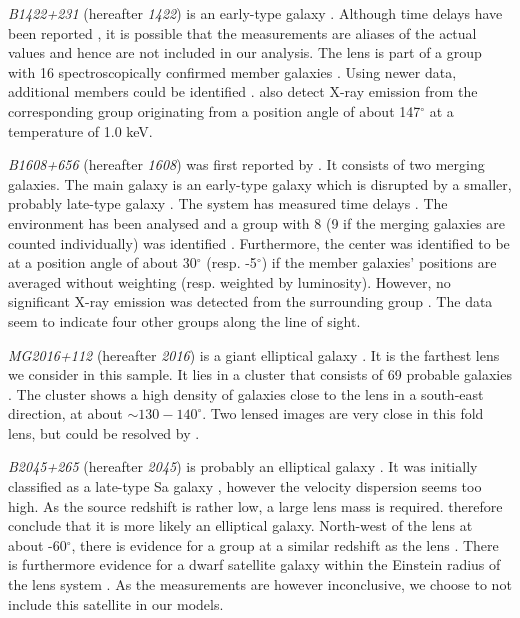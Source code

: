 \documentclass[useAMS,usenatbib]{mn2e}
\begin{document}
\textit{B1422+231} (hereafter \textit{1422}) is an early-type galaxy \citep{1992MNRAS.259P...1P,1994AJ....107...28Y}. Although time delays have been reported \citep{2001MNRAS.326.1403P}, it is possible that the measurements are aliases of the actual values \citep{2003AJ....126...29R} and hence are not included in our analysis. The lens is part of a group with 16 spectroscopically confirmed member galaxies \citep{2006ApJ...641..169M}. Using newer data, additional members could be identified \citep{2011ApJ...726...84W}. \citet{2004ApJ...610..686G} also detect X-ray emission from the corresponding group originating from a position angle of about 147$^{\circ}$ at a temperature of 1.0 keV.

\textit{B1608+656} (hereafter \textit{1608}) was first reported by \citet{1995ApJ...447L...5M}. It consists of two merging galaxies. The main galaxy is an early-type galaxy which is disrupted by a smaller, probably late-type galaxy \citep{2003ApJ...584..100S}. The system has measured time delays \citep{2002ApJ...581..823F}. The environment has been analysed and a group with 8 (9 if the merging galaxies are counted individually) was identified \citep{2006ApJ...642...30F}. Furthermore, the center was identified to be at a position angle of about 30$^{\circ}$ (resp. -5$^{\circ}$) if the member galaxies' positions are averaged without weighting (resp. weighted by luminosity). However, no significant X-ray emission was detected from the surrounding group \citep{2005ApJ...625..633D}. The data seem to indicate four other groups along the line of sight.

\textit{MG2016+112} (hereafter \textit{2016}) is a giant elliptical galaxy \citep{1984Sci...223...46L,1986AJ.....91..991S}. It is the farthest lens we consider in this sample. It lies in a cluster that consists of 69 probable galaxies \citep{2003MNRAS.344..337T}. The cluster shows a high density of galaxies close to the lens in a south-east direction, at about $\sim130-140^{\circ}$. Two lensed images are very close in this fold lens, but could be resolved by \citet{2009MNRAS.394..174M}.

\textit{B2045+265} (hereafter \textit{2045}) is probably an elliptical galaxy \citep{2007MNRAS.378..109M}. It was initially classified as a late-type Sa galaxy \citep{1999AJ....117..658F}, however the velocity dispersion seems too high. As the source redshift is rather low, a large lens mass is required. \citet{2007MNRAS.378..109M} therefore conclude that it is more likely an elliptical galaxy. North-west of the lens at about -60$^{\circ}$, there is evidence for a group at a similar redshift as the lens \citep{1999AJ....117..658F}. There is furthermore evidence for a dwarf satellite galaxy within the Einstein radius of the lens system \citep{2007MNRAS.378..109M}. As the measurements are however inconclusive, we choose to not include this satellite in our models.
\end{document}
